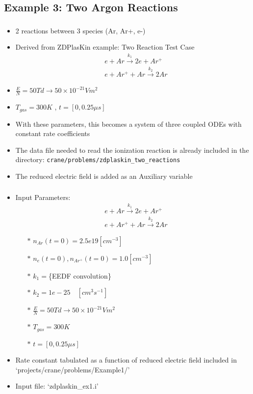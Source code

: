 \subsection{Example 3: Two Argon Reactions}
\begin{frame}[fragile]
	\frametitle{\insertsubsectionhead}
	\begin{itemize}
		\item 2 reactions between 3 species (Ar, Ar+, e-)
		\item Derived from ZDPlasKin example: Two Reaction Test Case \footnotemark
		\begin{align*}
			&e + Ar \xrightarrow{k_1} 2e + Ar^+  \\
			&e + Ar^+ + Ar \xrightarrow{k_2} 2Ar  
		\end{align*}
		\item $\tfrac{E}{N} = 50 Td \rightarrow 50\times 10^{-21} V m^2$
		\item $T_{gas} = 300 K$ , $t=[0,0.25 \mu s]$
		\item With these parameters, this becomes a system of three coupled ODEs with constant rate coefficients
		\item The data file needed to read the ionization reaction is already included in the directory: \texttt{crane/problems/zdplaskin\_two\_reactions}
		\item The reduced electric field is added as an Auxiliary variable

	\end{itemize}
\end{frame}

\begin{frame}[fragile]
	\frametitle{\insertsubsectionhead}
	\begin{itemize}
		\item Input Parameters:
		\begin{align*}
				&e + Ar \xrightarrow{k_1} 2e + Ar^+  \\
				&e + Ar^+ + Ar \xrightarrow{k_2} 2Ar  
			\end{align*}
		\begin{itemize}
			\item[$\ast$] $n_{Ar}(t=0) = 2.5e19 [cm^{-3}]$
			\item[$\ast$] $n_{e}(t=0), n_{Ar^+}(t=0) = 1.0 [cm^{-3}]$
			\item[$\ast$] $k_1 = $\{EEDF convolution\}
			\item[$\ast$] $k_2 = 1e-25 \quad [cm^3 s^{-1}]$
			\item[$\ast$] $\tfrac{E}{N} = 50 Td \rightarrow 50\times 10^{-21} V m^2$
			\item[$\ast$] $T_{gas} = 300 K$ 
			\item[$\ast$] $t=[0,0.25 \mu s]$
		\end{itemize}
	\item Rate constant tabulated as a function of reduced electric field included in `projects/crane/problems/Example1/'
	\item Input file: `zdplaskin\_ex1.i'
	\end{itemize}
\end{frame}

